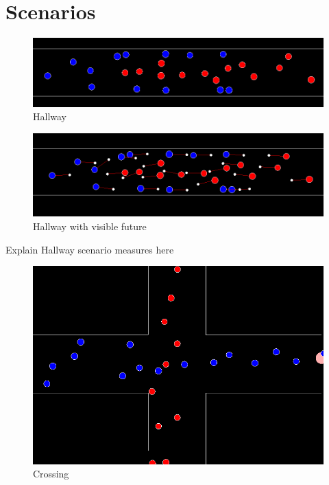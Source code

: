 \documentclass[draftclsnofoot]{IEEEtran}
\begin{document}
\newpage

\appendices

\section{Scenarios}

\begin{figure}[!ht]
    \begin{centering}
    \includegraphics[scale=0.25]{./pics/program/hallway-no-future}
    \par\end{centering}
    \caption{Hallway}
\end{figure}

\begin{figure}[!ht]
    \begin{centering}
    \includegraphics[scale=0.25]{./pics/program/hallway-future}
    \par\end{centering}
    \caption{Hallway with visible future}
\end{figure}


Explain Hallway scenario measures here


\begin{figure}[!ht]
    \begin{centering}
    \includegraphics[scale=0.2]{./pics/program/crossing-no-future}
    \par\end{centering}
    \caption{Crossing}
\end{figure}
\end{document}
